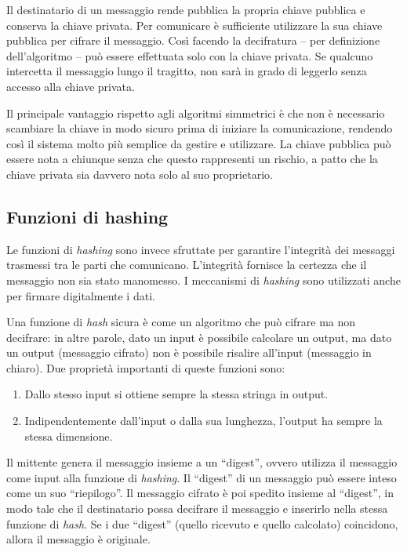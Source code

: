 Il destinatario di un messaggio rende pubblica la propria chiave pubblica e conserva la chiave privata. Per comunicare è sufficiente utilizzare la sua chiave pubblica per cifrare il messaggio. Così facendo la decifratura -- per definizione dell'algoritmo -- può essere effettuata solo con la chiave privata. Se qualcuno intercetta il messaggio lungo il tragitto, non sarà in grado di leggerlo senza accesso alla chiave privata.

Il principale vantaggio rispetto agli algoritmi simmetrici è che non è necessario scambiare la chiave in modo sicuro prima di iniziare la comunicazione, rendendo così il sistema molto più semplice da gestire e utilizzare. La chiave pubblica può essere nota a chiunque senza che questo rappresenti un rischio, a patto che la chiave privata sia davvero nota solo al suo proprietario.


\subsection{Funzioni di hashing}\label{subsec:funzioni_hashing}
Le funzioni di \textit{hashing} sono invece sfruttate per garantire l'integrità dei messaggi trasmessi tra le parti che comunicano. L'integrità fornisce la certezza che il messaggio non sia stato manomesso. I meccanismi di \textit{hashing} sono utilizzati anche per firmare digitalmente i dati.

Una funzione di \textit{hash} sicura è come un algoritmo che può cifrare ma non decifrare: in altre parole, dato un input è possibile calcolare un output, ma dato un output (messaggio cifrato) non è possibile risalire all'input (messaggio in chiaro). Due proprietà importanti di queste funzioni sono:
\begin{enumerate}
    \item Dallo stesso input si ottiene sempre la stessa stringa in output.
    \item Indipendentemente dall'input o dalla sua lunghezza, l'output ha sempre la stessa dimensione.
\end{enumerate}

Il mittente genera il messaggio insieme a un \enquote{digest}, ovvero utilizza il messaggio come input alla funzione di \textit{hashing}. Il \enquote{digest} di un messaggio può essere inteso come un suo \enquote{riepilogo}. Il messaggio cifrato è poi spedito insieme al \enquote{digest}, in modo tale che il destinatario possa decifrare il messaggio e inserirlo nella stessa funzione di \textit{hash}. Se i due \enquote{digest} (quello ricevuto e quello calcolato) coincidono, allora il messaggio è originale. 


